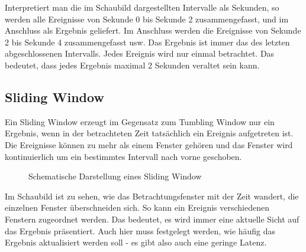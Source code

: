 \documentclass[a4paper,11pt]{scrartcl}
\begin{document}
  Interpretiert man die im Schaubild dargestellten Intervalle als Sekunden, so
  werden alle Ereignisse von Sekunde 0 bis Sekunde 2 zusammengefasst, und im
  Anschluss als Ergebnis geliefert. Im Anschluss werden die Ereignisse von
  Sekunde 2 bis Sekunde 4 zusammengefasst usw. Das Ergebnis ist immer das des
  letzten abgeschlossenen Intervalls. Jedes Ereignis wird nur einmal
  betrachtet. Das bedeutet, dass jedes Ergebnis maximal 2 Sekunden veraltet
  sein kann.

  \subsection{Sliding Window}
  Ein Sliding Window erzeugt im Gegensatz zum Tumbling Window nur ein Ergebnis,
  wenn in der betrachteten Zeit tatsächlich ein Ereignis aufgetreten ist. Die
  Ereignisse können zu mehr als einem Fenster gehören und das Fenster wird
  kontinuierlich um ein bestimmtes Intervall nach vorne
  geschoben.\cite[S.~472]{kleppmann17}
  \begin{figure}[!h]
    \centering
    \caption{Schematische Darstellung eines Sliding Window}
  \end{figure}

  Im Schaubild ist zu sehen, wie das Betrachtungsfenster mit der Zeit
  wandert, die einzelnen Fenster überschneiden sich. So kann ein
  Ereignis verschiedenen Fenstern zugeordnet werden. Das bedeutet, es
  wird immer eine aktuelle Sicht auf das Ergebnis präsentiert. Auch
  hier muss festgelegt werden, wie häufig das Ergebnis aktualisiert
  werden soll - es gibt also auch eine geringe Latenz.


\end{document}
